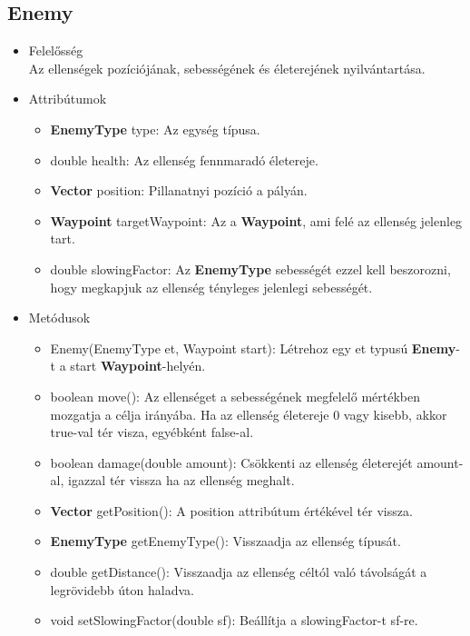 \subsection{Enemy}
\begin{itemize}
\item Felelősség\\
Az ellenségek pozíciójának, sebességének és életerejének nyilvántartása.
\item Attribútumok
	\begin{itemize}
		\item \textbf{EnemyType} type: Az egység típusa.
		\item double health: Az ellenség fennmaradó életereje.
		\item \textbf{Vector} position: Pillanatnyi pozíció a pályán.
		\item \textbf{Waypoint} targetWaypoint: Az a \textbf{Waypoint}, ami felé az ellenség jelenleg tart.
		\item double slowingFactor: Az \textbf{EnemyType} sebességét ezzel kell beszorozni, hogy megkapjuk az ellenség tényleges jelenlegi sebességét.
	\end{itemize}
\item Metódusok
	\begin{itemize}
		\item Enemy(EnemyType et, Waypoint start): Létrehoz egy et typusú \textbf{Enemy}-t a start \textbf{Waypoint}-helyén.
		\item boolean move(): Az ellenséget a sebességének megfelelő mértékben mozgatja a célja irányába. Ha az ellenség életereje 0 vagy kisebb, akkor true-val tér visza, egyébként false-al.
		\item boolean damage(double amount): Csökkenti az ellenség életerejét amount-al, igazzal tér vissza ha az ellenség meghalt.
		\item \textbf{Vector} getPosition(): A position attribútum értékével tér vissza.
		\item \textbf{EnemyType} getEnemyType(): Visszaadja az ellenség típusát.
		\item double getDistance(): Visszaadja az ellenség céltól való távolságát a legrövidebb úton haladva.
		\item void setSlowingFactor(double sf): Beállítja a slowingFactor-t sf-re.
	\end{itemize}
\end{itemize}


